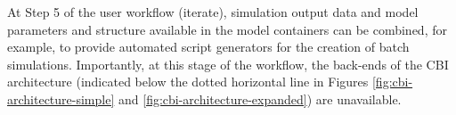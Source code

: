 \documentclass[11pt,3p,twocolumn]{JMN}
\begin{document}
At Step 5 of the user workflow (iterate), simulation output data and model parameters and structure available in the model containers can be combined, for example, to provide automated script generators for the creation of batch simulations. Importantly, at this stage of the workflow, the back-ends of the CBI architecture (indicated below the dotted horizontal line in Figures \ref{fig:cbi-architecture-simple} and \ref{fig:cbi-architecture-expanded}) are unavailable. 






\end{document}
